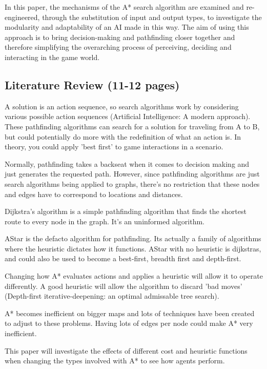 \documentclass[10pt]{article}
\begin{document}
In this paper, the mechanisms of the A* search algorithm are examined and re-engineered, through the substitution of input and output types, to investigate the modularity and adaptability of an AI made in this way. The aim of using this approach is to bring decision-making and pathfinding closer together and therefore simplifying the overarching process of perceiving, deciding and interacting in the game world.

\subsection{Literature Review (11-12 pages)}

A solution is an action sequence, so search algorithms work by considering various possible action sequences (Artificial Intelligence: A modern approach). These pathfinding algorithms can search for a solution for traveling from A to B, but could potentially do more with the redefinition of what an action is. In theory, you could apply 'best first' to game interactions in a scenario.

Normally, pathfinding takes a backseat when it comes to decision making and just generates the requested path. However, since pathfinding algorithms are just search algorithms being applied to graphs, there's no restriction that these nodes and edges have to correspond to locations and distances.

Dijkstra's algorithm is a simple pathfinding algorithm that finds the shortest route to every node in the graph. It's an uninformed algorithm.

AStar is the defacto algorithm for pathfinding. Its actually a family of algorithms where the heuristic dictates how it functions. AStar with no heuristic is dijkstras, and could also be used to become a best-first, breadth first and depth-first.

Changing how A* evaluates actions and applies a heuristic will allow it to operate differently. A good heuristic will allow the algorithm to discard 'bad moves' (Depth-first iterative-deepening: an optimal admissable tree search).

A* becomes inefficient on bigger maps and lots of techniques have been created to adjust to these problems. Having lots of edges per node could make A* very inefficient.

This paper will investigate the effects of different cost and heuristic functions when changing the types involved with A* to see how agents perform.
\end{document}
